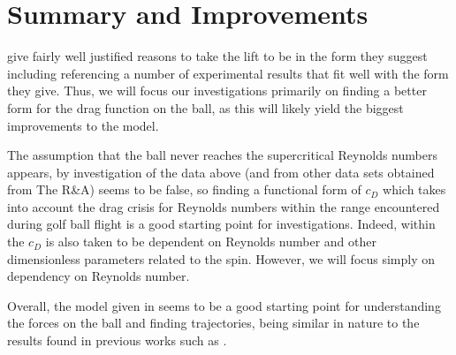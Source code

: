 \section{Summary and Improvements}

\citet{Robinson2013} give fairly well justified reasons to take the lift to be in the form they suggest
including referencing a number of experimental results that fit well with the form they give. Thus,
we will focus our investigations primarily on finding a better form for the drag function on the ball,
as this will likely yield the biggest improvements to the model.

The assumption that the ball never reaches the supercritical Reynolds numbers appears, by investigation
of the data above (and from other data sets obtained from The R\&A) seems to be false, so finding a
functional form of $c_D$ which takes into account the drag crisis for Reynolds numbers within the
range encountered during golf ball flight is a good starting point for investigations. Indeed, within
\citet{Lieberman2001} the $c_D$ is also taken to be dependent on Reynolds number and other
dimensionless parameters related to the spin. However, we will focus simply on dependency on Reynolds
number.

Overall, the model given in \citet{Robinson2013} seems to be a good starting point for understanding
the forces on the ball and finding trajectories, being similar in nature to the results found in previous
works such as \citet{Bearman1976}.